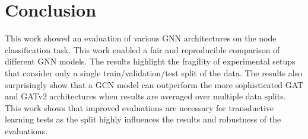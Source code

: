 \documentclass[runningheads]{llncs}
\begin{document}
\section{Conclusion}
This work showed an evaluation of various GNN architectures on the node
classification task. This work enabled a fair and reproducible comparison of different GNN models. The results highlight the fragility of experimental setups that consider only a single train/validation/test split of the data. The results also surprisingly show that a GCN model can outperform the more sophisticated GAT and GATv2 architectures when results are averaged over multiple data splits. This work shows that improved evaluations are necessary for transductive learning tests as the split highly influences the results and robustness of the evaluations.

%
%
%
\newpage


%
%
\end{document}
